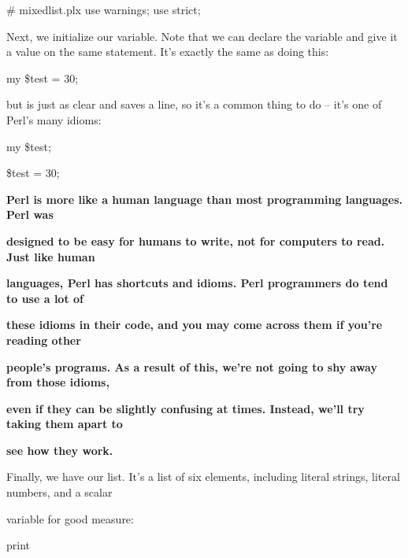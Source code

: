 \documentclass[a4paper,11pt]{book}
\begin{document}
\noindent \# mixedlist.plx use warnings; use strict;

\noindent 

\noindent Next, we initialize our variable. Note that we can declare the variable and give it a value on the same statement. It's exactly the same as doing this:

\noindent 

\noindent my \$test = 30;

\noindent 

\noindent 

\noindent but is just as clear and saves a line, so it's a common thing to do -- it's one of Perl's many idioms:

\noindent 

\noindent 

\noindent my \$test;

\noindent \$test = 30;

\noindent 

\noindent 

\noindent \textbf{Perl is more like a human language than most programming languages. Perl was}

\noindent \textbf{designed to be easy for humans to write, not for computers to read. Just like human}

\noindent \textbf{languages, Perl has shortcuts and idioms. Perl programmers do tend to use a lot of}

\noindent \textbf{these idioms in their code, and you may come across them if you're reading other}

\noindent \textbf{people's programs. As a result of this, we're not going to shy away from those idioms,}

\noindent \textbf{even if they can be slightly confusing at times. Instead, we'll try taking them apart to}

\noindent \textbf{see how they work.}

\noindent 

\noindent 

\noindent Finally, we have our list. It's a list of six elements, including literal strings, literal numbers, and a scalar

\noindent variable for good measure:

\noindent 

\noindent 

\noindent print

\noindent 

\noindent 
\end{document}
